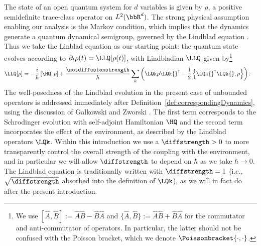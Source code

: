 \documentclass{article}
\numberwithin{equation}{section}
\begin{document}
The state of an open quantum system for $d$ variables is given by $\rho$, a positive semidefinite trace-class operator on $L^2(\bbR^d)$.  The strong physical assumption enabling our analysis is the Markov condition, which implies that the dynamics generate a quantum dynamical semigroup, governed by the Lindblad equation \cite{lindblad1976generators, davies1974markovian, davies1976markovian, davies1976quantum, davies1976classical, gorini1976completely, gorini1978properties, alicki2007quantum, chruscinski2017brief}.  Thus we take the Linblad equation as our starting point:
 the quantum state evolves 
according to $\partial_t\rho(t) = \LLQ[\rho(t)]$, with Lindbladian $\LLQ$ given by\footnote{We use $[\hat{A},\hat{B}]:=\hat{A}\hat{B}-\hat{B}\hat{A}$ and  $\{\hat{A},\hat{B}\}:=\hat{A}\hat{B} +\hat{B}\hat{A}$ for the commutator and anti-commutator of operators.  In particular, the latter should not be confused with the Poisson bracket, which we denote $\Poissonbracket{\cdot,\cdot}$.} 
\begin{align} \label{eq:lindblad-simple}
    \LLQ [\rho] &= -\frac{i}{\hbar}\left[\HQ,\rho\right]+
    \frac{\notdiffusionstrength}{\hbar} \sum_{k} \left(\LQk \rho \LQk{}^\dagger-\frac{1}{2}\left\{\LQk{}^\dagger\LQk{},\rho\right\}\right).
\end{align}
 The well-posedness of the Lindblad evolution in the present case of unbounded operators is addressed immediately after Definition~\ref{def:correspondingDynamics}, using the discussion of Galkowski and Zworski \cite{galkowski2024classical}. 
The first term corresponds to the Schrodinger evolution with self-adjoint Hamiltonian $\HQ$ and the second term incorporates the effect of the environment, as described by the Lindblad operators $\LQk$.  
Within this introduction we use a 
$\diffstrength >0$ to more transparently control the overall strength of the coupling with the environment, and in particular we will allow $\diffstrength$ to depend on $\hbar$ as we take $\hbar\to 0$.  
The Lindblad equation is traditionally written with $\diffstrength=1$ (i.e., $\sqrt{\diffstrength}$ absorbed into the definition of $\LQk$), as we will in fact do 
after the present introduction.
\end{document}
